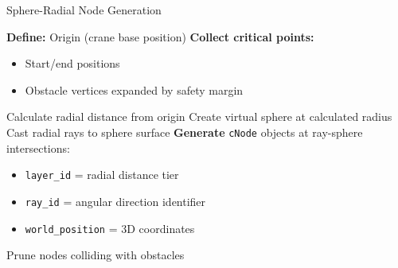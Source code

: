 \documentclass{article}
\begin{document}
\begin{algorithm}
\caption{Sphere-Radial Node Generation}
\begin{algorithmic}[1]
    \State \textbf{Define:} Origin (crane base position)
    \State \textbf{Collect critical points:}
    \begin{itemize}
        \item Start/end positions
        \item Obstacle vertices expanded by safety margin
    \end{itemize}
        \State Calculate radial distance from origin
        \State Create virtual sphere at calculated radius
        \State Cast radial rays to sphere surface
    \EndFor
    \State \textbf{Generate} \texttt{cNode} objects at ray-sphere intersections:
    \begin{itemize}
        \item \texttt{layer\_id} = radial distance tier
        \item \texttt{ray\_id} = angular direction identifier
        \item \texttt{world\_position} = 3D coordinates
    \end{itemize}
    \State Prune nodes colliding with obstacles
\end{algorithmic}
\end{algorithm}
\end{document}
